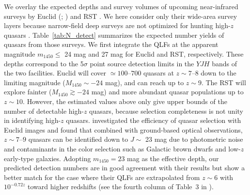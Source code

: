\documentclass[twocolumn, twocolappendix]{aastex63}
\newcommand{\Muv}{M_{1450}}
\begin{document}
\begin{CJK*}{UTF8}{gbsn}
We overlay the expected depths and survey volumes of upcoming near-infrared surveys by
Euclid (\citealt{2011arXiv1110.3193L}; \citealt{2019Barnett}) and RST \citep{2019arXiv190205569A}.
We here consider only their wide-area survey layers because narrow-field deep surveys are not optimized for hunting high-$z$ quasars \citep[but see][]{2022arXiv220907325O}.
Table~\ref{tab:N_detect} summarizes the expected number yields of quasars from those surveys.
We first integrate the QLFs at the apparent magnitude $m_{1450}\leq$ 24 mag and 27 mag for Euclid and RST, respectively.
These depths correspond to the 5$\sigma$ point source detection limits in the $YJH$ bands of the two facilities.
Euclid will cover $\simeq 100$--$700$ quasars at $z\sim 7$--$8$ down to the limiting magnitude ($\Muv \sim -24$ mag),
and can reach up to $z\sim 9$.
The RST will explore fainter ($\Muv \gtrsim -24$ mag) and more abundant quasar populations up to $z\sim 10$.
However, the estimated values above only give upper bounds of the number of detectable high-$z$ quasars,
because selection completeness is not unity in identifying high-$z$ quasars.
\citet{2019Barnett} investigated the efficiency of quasar selection with Euclid images
and found that combined with ground-based optical observations,
$z\sim 7$--$9$ quasars can be identified down to $J \sim$ 23 mag
due to photometric noise and contaminants in the color selection such as Galactic brown dwarfs and low-$z$ early-type galaxies.
Adopting $m_{1450}=23$ mag as the effective depth, %
our predicted detection numbers are in good agreement with their results but show a better match for the case
where their QLFs are extrapolated from $z\sim 6$ with $10^{-0.72z}$ toward higher redshifts
(see the fourth column of Table~3 in \citealt{2019Barnett}).


\end{CJK*}
\end{document}
